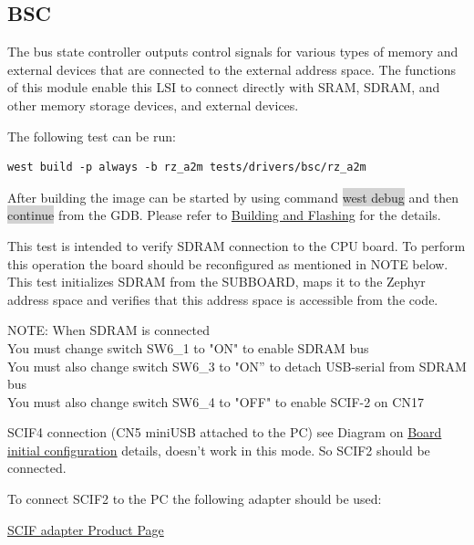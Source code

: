 \documentclass[11pt,a4paper,oneside]{article}
\begin{document}
\subsection{BSC}\label{bsc}

The bus state controller outputs control signals for various types of
memory and external devices that are connected to the external address
space. The functions of this module enable this LSI to connect directly
with SRAM, SDRAM, and other memory storage devices, and external
devices.

The following test can be run:

\begin{lstlisting}
west build -p always -b rz_a2m tests/drivers/bsc/rz_a2m
\end{lstlisting}

After building the image can be started by using command \colorbox{lightgray}{west debug}
and then \colorbox{lightgray}{continue} from the GDB. Please refer to
\hyperref[building-and-flashing]{Building and Flashing} for the
details.

This test is intended to verify SDRAM connection to the CPU board. To
perform this operation the board should be reconfigured as mentioned in
NOTE below. This test initializes SDRAM from the SUBBOARD, maps it to
the Zephyr address space and verifies that this address space is
accessible from the code.

NOTE: When SDRAM is connected\\
You must change switch SW6\_1 to "ON" to enable SDRAM bus\\
You must also change switch SW6\_3 to "ON'' to detach USB-serial from
SDRAM bus\\
You must also change switch SW6\_4 to "OFF" to enable SCIF-2 on CN17

SCIF4 connection (CN5 miniUSB attached to the PC) see Diagram on
\hyperref[board-initial-configuration]{Board initial configuration}
details, doesn't work in this mode. So SCIF2 should be connected.

To connect SCIF2 to the PC the following adapter should be used:

\href{https://www.ebay.com/itm/374576049950?hash=item573678ef1e:g:v1sAAOSwx7pkGapp&amdata=enc%3AAQAIAAAA8MQ4P8oojMoR6H4TwJkrlrD0d39kQ7hfOOSnDeCt%2Bp3hjsAZsig8OM8eNojvjmkFV5rzU3w89k8DUQRijARt5vJV6nEF8vslmPLoG%2F9rEO4iy%2BYYnA8w3IR8Vqh7fuWcA2zkr1483%2FK4b1ianYJT%2BRnJkO5w%2FmHajRHkP8Et5fxsovnGXJH58bJCnbJTqB5lLAcFF%2FmVTEn86GlCnc0GgqxhcNJVjpJRhxwsb49LQajClAH%2F%2BU01LcJBLxqCBABTiPj0GPFBi%2BjUOX3uDEhu1qCSVopHX%2BfdeM3TS2k9qYZbvkRViqIr%2FZfGa5AprKoH9w%3D%3D%7Ctkp%3ABFBM1rL9heNi}{SCIF adapter Product Page}
\end{document}

